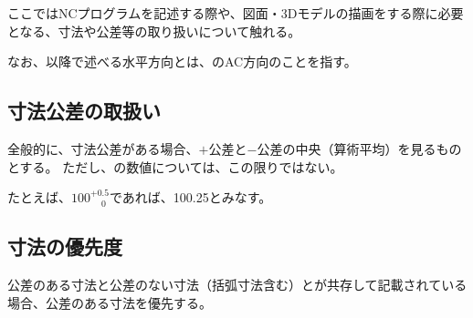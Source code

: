 

ここではNCプログラムを記述する際や、図面・3Dモデルの描画をする際に必要となる、寸法や公差等の取り扱いについて触れる。

なお、以降で述べる水平方向とは、\EndFace のAC方向のことを指す。





\subsection{寸法公差の取扱い}
全般的に、寸法公差がある場合、$+$公差と$-$公差の中央（算術平均）を見るものとする。
ただし、\IDTaperTable の数値については、この限りではない。
\begin{hosoku}
たとえば、$100^{+0.5}_{\phantom -0}$であれば、100.25とみなす。
\end{hosoku}


\subsection{寸法の優先度}
公差のある寸法と公差のない寸法（括弧寸法含む）とが共存して記載されている場合、公差のある寸法を優先する。

